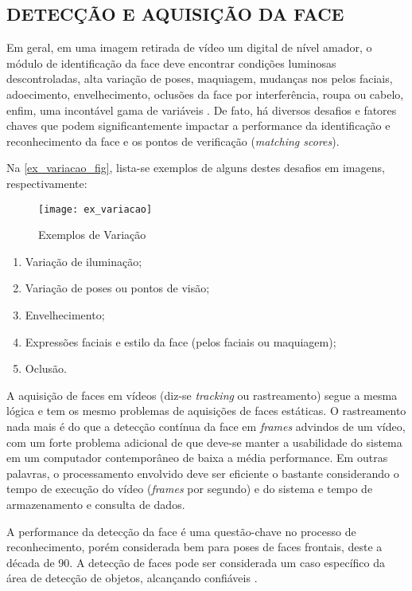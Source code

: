 \subsection{DETECÇÃO E AQUISIÇÃO DA FACE}\label{subsec:aquisicao_imagem}

Em geral, em uma imagem retirada de vídeo um digital de nível amador, o módulo de identificação da face deve encontrar condições luminosas descontroladas, alta variação de poses, maquiagem, mudanças nos pelos faciais, adoecimento, envelhecimento, oclusões da face por interferência, roupa ou cabelo, enfim, uma incontável gama de variáveis \cite{tony_columbia}. De fato, há diversos desafios e fatores chaves que podem significantemente impactar a performance da identificação e reconhecimento da face e os pontos de verificação (\textit{matching scores}).

Na \autoref{ex_variacao_fig}, lista-se exemplos de alguns destes desafios em imagens, respectivamente:

\begin{figure}[h]
	\centering
	\texttt{[image: ex\_variacao]}
	\caption{Exemplos de Variação}
	\label{ex_variacao_fig}
\end{figure}


\begin{enumerate}[label=(\alph*)]
	\item Variação de iluminação;
	\item Variação de poses ou pontos de visão;
	\item Envelhecimento;
	\item Expressões faciais e estilo da face (pelos faciais ou maquiagem);
	\item Oclusão.
\end{enumerate}


A aquisição de faces em vídeos (diz-se \textit{tracking} ou rastreamento) segue a mesma lógica e tem os mesmo problemas de aquisições de faces estáticas. O rastreamento nada mais é do que a detecção contínua da face em \textit{frames} advindos de um vídeo, com um forte problema adicional de que deve-se manter a usabilidade do sistema em um computador contemporâneo de baixa a média performance. Em outras palavras, o processamento envolvido deve ser eficiente o bastante considerando o tempo de execução do vídeo (\textit{frames} por segundo) e do sistema e tempo de armazenamento e consulta de dados.

A performance da detecção da face é uma questão-chave no processo de reconhecimento, porém considerada bem para poses de faces frontais, deste a década de 90. A detecção de faces pode ser considerada um caso específico da área de detecção de objetos, alcançando confiáveis \cite{stats_face_detection_IEEE}.

